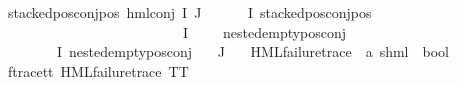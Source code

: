 \begin{isabellebody}
{\isachardoublequoteopen}stacked{\isacharunderscore}{\kern0pt}pos{\isacharunderscore}{\kern0pt}conj{\isacharunderscore}{\kern0pt}pos\ {\isacharparenleft}{\kern0pt}hml{\isacharunderscore}{\kern0pt}conj\ I\ J\ {\isasymPhi}{\isacharparenright}{\kern0pt}{\isachardoublequoteclose}\isanewline
{}\ {\isachardoublequoteopen}{\isacharparenleft}{\kern0pt}{\isacharparenleft}{\kern0pt}{\isasymexists}{\isasymphi}\ {\isasymin}\ {\isacharparenleft}{\kern0pt}{\isasymPhi}\ {\isacharbackquote}{\kern0pt}\ I{\isacharparenright}{\kern0pt}{\isachardot}{\kern0pt}\ {\isacharparenleft}{\kern0pt}{\isacharparenleft}{\kern0pt}stacked{\isacharunderscore}{\kern0pt}pos{\isacharunderscore}{\kern0pt}conj{\isacharunderscore}{\kern0pt}pos\ {\isasymphi}{\isacharparenright}{\kern0pt}\ {\isasymand}\ \isanewline
\ \ \ \ \ \ \ \ \ \ \ \ \ \ \ \ \ \ \ \ \ {\isacharparenleft}{\kern0pt}{\isasymforall}{\isasympsi}\ {\isasymin}\ {\isacharparenleft}{\kern0pt}{\isasymPhi}\ {\isacharbackquote}{\kern0pt}\ I{\isacharparenright}{\kern0pt}{\isachardot}{\kern0pt}\ {\isasympsi}\ {\isasymnoteq}\ {\isasymphi}\ {\isasymlongrightarrow}\ nested{\isacharunderscore}{\kern0pt}empty{\isacharunderscore}{\kern0pt}pos{\isacharunderscore}{\kern0pt}conj\ {\isasympsi}{\isacharparenright}{\kern0pt}{\isacharparenright}{\kern0pt}{\isacharparenright}{\kern0pt}\ {\isasymor}\isanewline
\ \ \ {\isacharparenleft}{\kern0pt}{\isasymforall}{\isasympsi}\ {\isasymin}\ {\isacharparenleft}{\kern0pt}{\isasymPhi}\ {\isacharbackquote}{\kern0pt}\ I{\isacharparenright}{\kern0pt}{\isachardot}{\kern0pt}\ nested{\isacharunderscore}{\kern0pt}empty{\isacharunderscore}{\kern0pt}pos{\isacharunderscore}{\kern0pt}conj\ {\isasympsi}{\isacharparenright}{\kern0pt}{\isacharparenright}{\kern0pt}{\isachardoublequoteclose}\isanewline
{\isachardoublequoteopen}{\isacharparenleft}{\kern0pt}{\isasymPhi}\ {\isacharbackquote}{\kern0pt}\ J{\isacharparenright}{\kern0pt}\ {\isacharequal}{\kern0pt}\ {\isacharbraceleft}{\kern0pt}{\isacharbraceright}{\kern0pt}{\isachardoublequoteclose}\isanewline
\isanewline
{}\isamarkupfalse%
\ HML{\isacharunderscore}{\kern0pt}failure{\isacharunderscore}{\kern0pt}trace\ {\isacharcolon}{\kern0pt}{\isacharcolon}{\kern0pt}\ {\isachardoublequoteopen}{\isacharparenleft}{\kern0pt}{\isacharprime}{\kern0pt}a{\isacharcomma}{\kern0pt}\ {\isacharprime}{\kern0pt}s{\isacharparenright}{\kern0pt}hml\ {\isasymRightarrow}\ bool{\isachardoublequoteclose}\isanewline
\ \ \isanewline
f{\isacharunderscore}{\kern0pt}trace{\isacharunderscore}{\kern0pt}tt{\isacharcolon}{\kern0pt}\ {\isachardoublequoteopen}HML{\isacharunderscore}{\kern0pt}failure{\isacharunderscore}{\kern0pt}trace\ TT{\isachardoublequoteclose}\ {\isacharbar}{\kern0pt}\isanewline

\end{isabellebody}
